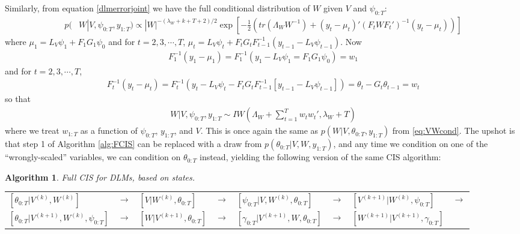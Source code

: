 \documentclass{article}
\newtheorem{alg}{Algorithm}
\begin{document}
Similarly, from equation \eqref{dlmerrorjoint} we have the full conditional distribution of $W$ given $V$ and $\psi_{0:T}$:
\begin{align*}
    p(&W|V,\psi_{0:T},y_{1:T}) \propto  |W|^{-(\lambda_W + k + T + 2)/2}\exp\left[-\frac{1}{2}\left(tr\left(\Lambda_WW^{-1}\right) + (y_t - \mu_t)'(F_tWF_t')^{-1}(y_t-\mu_t)\right)\right]
\end{align*}
where $\mu_1 = L_V\psi_1 + F_1G_1\psi_0$ and for $t=2,3,\cdots,T$, $\mu_t =L_V\psi_t + F_tG_tF_{t-1}^{-1}(y_{t-1} - L_{V}\psi_{t-1})$. Now 
\begin{align*}
  F_1^{-1}(y_1-\mu_1)=F_1^{-1}(y_1-L_V\psi_1 = F_1G_1\psi_0)=w_1
\end{align*}
and for $t=2,3,\cdots,T$, 
\begin{align*}
  F_t^{-1}(y_t-\mu_t)=F_t^{-1}(y_t-L_V\psi_t - F_tG_tF_{t-1}^{-1}[y_{t-1}-L_V\psi_{t-1}])=\theta_t-G_t\theta_{t-1}=w_t
\end{align*}
so that 
\begin{align*}
  W|V,\psi_{0:T},y_{1:T} \sim IW\left(\Lambda_W + \sum_{t=1}^Tw_tw_t',\lambda_{W} + T\right)
\end{align*}
where we treat $w_{1:T}$ as a function of $\psi_{0:T}$, $y_{1:T}$, and $V$. This is once again the same as $p(W|V,\theta_{0:T},y_{1:T})$ from \eqref{eq:VWcond}. The upshot is that step 1 of Algorithm \ref{alg:FCIS} can be replaced with a draw from $p(\theta_{0:T}|V,W,y_{1:T})$, and any time we condition on one of the ``wrongly-scaled'' variables, we can condition on $\theta_{0:T}$ instead, yielding the following version of the same CIS algorithm:
\begin{alg}Full CIS for DLMs, based on states.\label{alg:FCIS2}\\
  \begin{center}
    \begin{tabular}{llllllll}
      $[\theta_{0:T}|V^{(k)},W^{(k)}]$& $\to $& $[V|W^{(k)},\theta_{0:T}]$& $\to$& $[\psi_{0:T}|V,W^{(k)},\theta_{0:T}]$& $\to$& $[V^{(k+1)}|W^{(k)},\psi_{0:T}]$& $\to$\\
      $[\theta_{0:T}|V^{(k+1)},W^{(k)},\psi_{0:T}]$& $\to$& $[W|V^{(k+1)},\theta_{0:T}]$& $\to$& $[\gamma_{0:T}|V^{(k+1)},W,\theta_{0:T}]$& $\to$& $[W^{(k+1)}|V^{(k+1)},\gamma_{0:T}]$
    \end{tabular}
  \end{center}
\end{alg}
\end{document}
